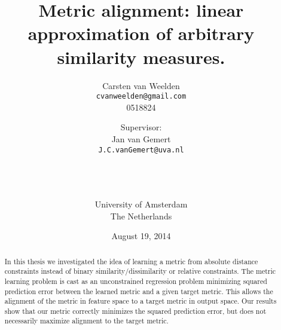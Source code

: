 \documentclass[a4paper,twoside,openright]{report}
\title{Metric alignment: linear approximation of arbitrary similarity measures.}
\author{Carsten van Weelden  \\ \texttt{cvanweelden@gmail.com} \\ 0518824 \and \small{Supervisor:} \\ Jan van Gemert \\ \texttt{J.C.vanGemert@uva.nl} \and \\\\\\ University of Amsterdam\\
  The Netherlands}
\date{August 19, 2014}                                           %
\begin{document}
\maketitle

\newpage\null\thispagestyle{empty}\newpage

\begin{abstract}
In this thesis we investigated the idea of learning a metric from absolute distance constraints instead of binary similarity/dissimilarity or relative constraints. The metric learning problem is cast as an unconstrained regression problem minimizing squared prediction error between the learned metric and a given target metric. This allows the alignment of the metric in feature space to a target metric in output space. Our results show that our metric correctly minimizes the squared prediction error, but does not necessarily maximize alignment to the target metric.
\end{abstract}

\newpage\null\thispagestyle{empty}\newpage

\tableofcontents




%
%














%

\end{document}
